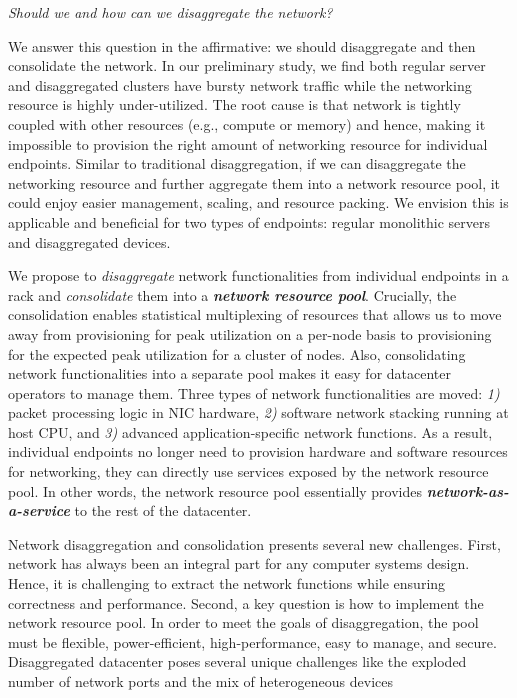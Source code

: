 \textit{Should we and how can we disaggregate the network?}

We answer this question in the affirmative:
we should disaggregate and then consolidate the network.
In our preliminary study,
we find both regular server and disaggregated clusters have bursty network traffic
while the networking resource is highly under-utilized.
The root cause is that network is tightly coupled with
other resources (e.g., compute or memory) and hence,
making it impossible to
provision the right amount of networking resource for individual endpoints.
Similar to traditional disaggregation,
if we can disaggregate the networking resource and further
aggregate them into a network resource pool,
it could enjoy easier management, scaling, and resource packing.
We envision this is applicable and beneficial
for two types of endpoints: regular monolithic servers
and disaggregated devices.

We propose to \textit{disaggregate} network functionalities
from individual endpoints in a rack
and \textit{consolidate} them into a \textbf{\textit{network resource pool}}.
%
Crucially, the consolidation enables statistical multiplexing of resources that
allows us to move away from provisioning for peak utilization
on a per-node basis to provisioning for the
expected peak utilization for a cluster of nodes.
Also, consolidating network functionalities into a separate
pool makes it easy for datacenter operators to manage them.
%
Three types of network functionalities are moved:
\textit{1)} packet processing logic in NIC hardware,
\textit{2)} software network stacking running at host CPU,
and \textit{3)} advanced application-specific network functions.
%
As a result, individual endpoints no longer need to provision
hardware and software resources for networking,
they can directly use services exposed by the network resource pool.
%
In other words, the network resource pool essentially provides
\textbf{\textit{network-as-a-service}} to the rest of the datacenter.


Network disaggregation and consolidation presents several new challenges.
%
First, network has always been an integral part for any computer systems design.
Hence, it is challenging to extract the network functions
while ensuring correctness and performance.
%
Second, a key question is how to implement the network resource pool.
In order to meet the goals of disaggregation,
the pool must be flexible, power-efficient, high-performance, easy to manage, and secure.
Disaggregated datacenter poses several unique challenges
like the exploded number of network ports and the mix of heterogeneous devices
\fi



